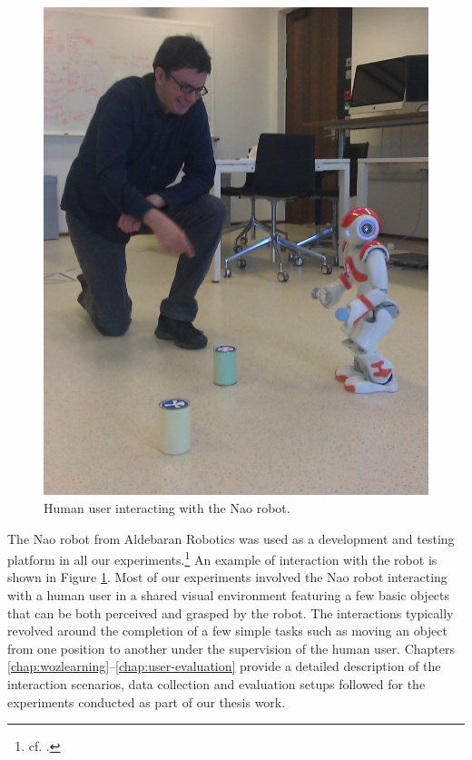 \begin{figure}
\vspace{-6mm}
\begin{center}
\includegraphics[scale=0.09]{imgs/nao1.jpg}
\end{center} 
\caption{Human user interacting with the Nao robot.}
\label{fig:nao}
\end{figure}

The Nao robot from Aldebaran Robotics was used as a development and testing platform in all our experiments.\footnote{cf.  .} An example of interaction with the robot is shown in Figure \ref{fig:nao}.  Most of our experiments involved the Nao robot interacting with a human user in a shared visual environment featuring a few basic objects that can be both perceived and grasped by the robot.  The interactions typically revolved around the completion of a few simple tasks such as moving an object from one position to another under the supervision of the human user. Chapters \ref{chap:wozlearning}--\ref{chap:user-evaluation} provide a detailed description of the interaction scenarios, data collection and evaluation setups followed for the experiments conducted as part of our thesis work. 

